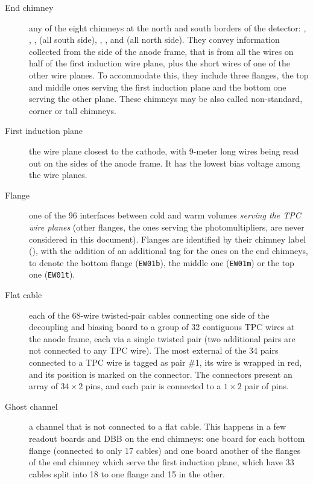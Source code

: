 \begin{description}
  \item[End chimney]
    any of the eight chimneys at the north and south borders of the detector:
    , , ,  (all south side),
    , ,  and  (all north side).
    They convey information collected from the side of the anode frame, that is
    from all the wires on half of the first induction wire plane,
    plus the short wires of one of the other wire planes.
    To accommodate this, they include three flanges, the top and middle ones
    serving the first induction plane and the bottom one serving the other plane.
    These chimneys may be also called non-standard, corner or tall chimneys.

  \item[First induction plane]
    the wire plane closest to the cathode,
    with 9-meter long wires being read out on the sides of the anode frame.
    It has the lowest bias voltage among the wire planes.

  \item[Flange]
    one of the 96 interfaces between cold and warm volumes
    \emph{serving the TPC wire planes}
    (other flanges, \eg the ones serving the photomultipliers, are never
    considered in this document).
    Flanges are identified by their chimney label (\eg {}), with the
    addition of an additional tag for the ones on the end chimneys,
    to denote the bottom flange (\texttt{EW01b}),
    the middle one (\texttt{EW01m}) or the top one (\texttt{EW01t}).

  \item[Flat cable]
    each of the 68-wire twisted-pair cables connecting one side
    of the decoupling and biasing board to a group of 32 contiguous TPC wires
    at the anode frame, each via a single twisted pair (two additional pairs are
    not connected to any TPC wire). The most external of the 34 pairs connected
    to a TPC wire is tagged as pair \#1, its wire is wrapped in red, and its
    position is marked on the connector. The connectors present an array of
    $34 \times 2$ pins, and each pair is connected to a $1 \times 2$ pair of
    pins.

  \item[Ghost channel]
    a channel that is not connected to a flat cable.
    This happens in a few readout boards and DBB on the end chimneys:
    one board for each bottom flange (connected to only 17 cables)
    and one board another of the flanges of the end chimney which serve the
    first induction plane, which have 33 cables split into 18 to one flange
    and 15 in the other.
  

\end{description}
